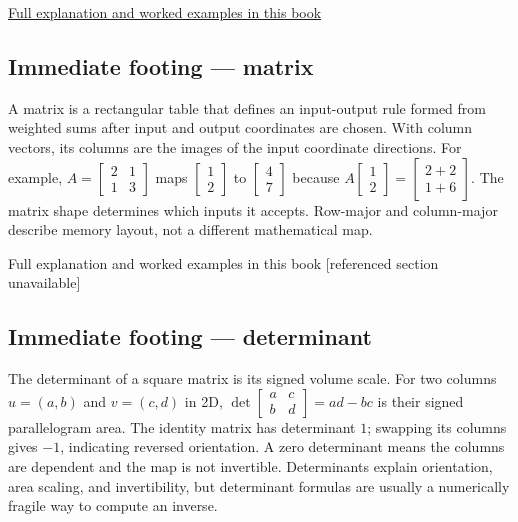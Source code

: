 \hyperref[01-foundations-i-ch017-numbers-become-a-system-of-permitted-operations]{Full explanation and worked examples in this book}

\subsection{Immediate footing --- matrix}\label{01-foundations-i-ch018-immediate-footing-matrix}

A matrix is a rectangular table that defines an input-output rule formed from weighted sums after input and output coordinates are chosen. With column vectors, its columns are the images of the input coordinate directions. For example, \(A=\begin{bmatrix}2&1\\1&3\end{bmatrix}\) maps \(\begin{bmatrix}1\\2\end{bmatrix}\) to \(\begin{bmatrix}4\\7\end{bmatrix}\) because \(A\begin{bmatrix}1\\2\end{bmatrix}=\begin{bmatrix}2+2\\1+6\end{bmatrix}\). The matrix shape determines which inputs it accepts. Row-major and column-major describe memory layout, not a different mathematical map.

{Full explanation and worked examples in this book {[}referenced section unavailable{]}}

\subsection{Immediate footing --- determinant}\label{01-foundations-i-ch018-immediate-footing-determinant}

The determinant of a square matrix is its signed volume scale. For two columns \(u=(a,b)\) and \(v=(c,d)\) in 2D, \(\det\begin{bmatrix}a&c\\b&d\end{bmatrix}=ad-bc\) is their signed parallelogram area. The identity matrix has determinant \(1\); swapping its columns gives \(-1\), indicating reversed orientation. A zero determinant means the columns are dependent and the map is not invertible. Determinants explain orientation, area scaling, and invertibility, but determinant formulas are usually a numerically fragile way to compute an inverse.

